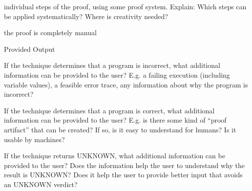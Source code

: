 \documentclass[a4paper]{article}
\begin{document}
\begin{minipage}[t]{0.16\linewidth}
\begin{betterlist}
\begin{betterlist}
			\item \checkboxUnchecked individual steps of the proof, using some proof system. Explain: Which steps can be applied systematically? Where is creativity needed?

			\item \checkboxUnchecked the proof is completely manual
		\end{betterlist}
		\item \alert{Provided Output}
		\begin{betterlist}
			\item If the technique determines that a program is incorrect, what additional information can be provided to the user? E.g. a failing execution (including variable values), a feasible error trace, any information about why the program is incorrect?

			\item If the technique determines that a program is correct, what additional information can be provided to the user? E.g. is there some kind of \enquote{proof artifact} that can be created? If so, is it easy to understand for humans? Is it usable by machines?

			\item If the technique returns UNKNOWN, what additional information can be provided to the user? Does the information help the user to understand why the result is UNKNOWN? Does it help the user to provide better input that avoids an UNKNOWN verdict?


\end{betterlist}
\end{betterlist}
\end{minipage}
\end{document}
